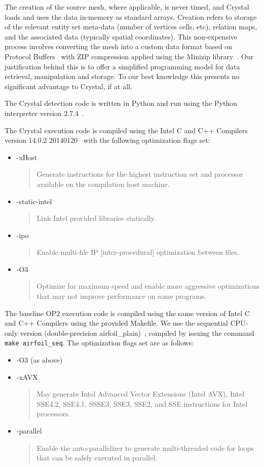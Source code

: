 The creation of the source mesh, where applicable, is never timed, and Crystal loads and uses the data in-memory as standard arrays. Creation refers to storage of the relevant entity set meta-data (number of vertices cells, etc), relation maps, and the associated data (typically spatial coordinates). This non-expensive process involves converting the mesh into a custom data format based on Protocol Buffers~\cite{protocolbuffers} with ZIP compression applied using the Minizip library~\cite{minizip}. Our justification behind this is to offer a simplified programming model for data retrieval, manipulation and storage. To our best knowledge this presents no significant advantage to Crystal, if at all.

The Crystal detection code is written in Python and run using the Python interpreter version 2.7.4~\cite{python}.

The Crystal execution code is compiled using the Intel\textregistered{} C and C++ Compilers version 14.0.2 20140120~\cite{icc} with the following optimization flags set:
\begin{itemize}
\item -xHost
\begin{quote}Generate instructions for the highest instruction set and processor available on the compilation host machine.\end{quote}
\item -static-intel
\begin{quote}Link Intel provided libraries statically.\end{quote}
\item -ipo
\begin{quote}Enable multi-file IP [inter-procedural] optimization between files.\end{quote}
\item -O3
\begin{quote}Optimize for maximum speed and enable more aggressive optimizations that may not improve performance on some programs.\end{quote}
\end{itemize}

The baseline OP2 execution code is compiled using the same version of Intel\textregistered{} C and C++ Compilers using the provided Makefile. We use the sequential CPU-only version (double-precision airfoil\_plain)~\cite{op2airfoil}, compiled by issuing the command \texttt{make airfoil\_seq}. The optimization flags set are as follows:
\begin{itemize}
\item -O3 (as above)
\item -xAVX
\begin{quote}May generate Intel\textregistered{} Advanced Vector Extensions (Intel\textregistered{} AVX), Intel\textregistered{} SSE4.2, SSE4.1, SSSE3, SSE3, SSE2, and SSE instructions for Intel\textregistered{} processors.\end{quote}
\item -parallel
\begin{quote}Enable the auto-parallelizer to generate multi-threaded code for loops that can be safely executed in parallel.\end{quote}
\end{itemize}


